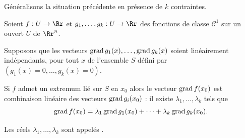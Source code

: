 \documentclass[11pt, class=report,crop=false]{standalone}
\begin{document}
Généralisons la situation précédente en présence de $k$ contraintes.

\begin{theoreme}
Soient $f: U \to \Rr$ et $g_1,\ldots,g_k : U \to \Rr$ des fonctions de classe $\mathcal{C}^1$
sur un ouvert $U$ de $\Rr^n$.

Supposons que les vecteurs $\operatorname{grad} g_1(x),\ldots, \operatorname{grad} g_k(x)$  soient linéairement indépendants, pour tout $x$ de l'ensemble $S$ défini par $(g_1(x)=0,\ldots,g_k(x)=0)$.

Si $f$ admet un extremum lié sur $S$ en $x_0$ alors le vecteur $\operatorname{grad} f(x_0)$ est combinaison linéaire des vecteurs $\operatorname{grad} g_i(x_0)$ : il existe $\lambda_1,\ldots,\lambda_k$ tels que 
$$\operatorname{grad} f(x_0)=\lambda_1\operatorname{grad} g_1(x_0) + \cdots + \lambda_k \operatorname{grad} g_k(x_0).$$
\end{theoreme}

Les réels $\lambda_1,\ldots,\lambda_k$ sont appelés .
\end{document}
